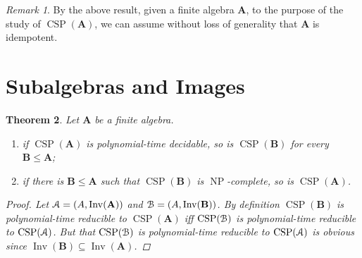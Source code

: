 \documentclass{amsart}
\theoremstyle{plain}
\newtheorem{theorem}{Theorem}[section]
\theoremstyle{definition}
\theoremstyle{remark}
\newtheorem{remark}[theorem]{Remark}
\DeclareMathOperator{\CSP}{CSP}
\DeclareMathOperator{\Inv}{Inv}
\DeclareMathOperator{\NP}{NP}
\begin{document}
\begin{remark}
    By the above result, given a finite algebra $\mathbf{A}$, to the purpose of the study of $\CSP(\mathbf{A})$, we can assume without loss of generality that $\mathbf{A}$ is idempotent. 
\end{remark}

\section{Subalgebras and Images}
\begin{theorem}
    \label{sub}
    Let $\mathbf{A}$ be a finite algebra. 
    \begin{enumerate}
        \item if $\CSP(\mathbf{A})$ is polynomial-time decidable, so is $\CSP(\mathbf{B})$ for every $\mathbf{B} \le \mathbf{A}$; 
        \item if there is $\mathbf{B} \le \mathbf{A}$ such that $\CSP(\mathbf{B})$ is $\NP$-complete, so is $\CSP(\mathbf{A})$. 
    \end{enumerate}
    \begin{proof}
    Let $\EuScript{A}=(A, \Inv(\mathbf{A}))$ and $\EuScript{B}=(A, \Inv(\mathbf{B}))$. 
    By definition $\CSP(\mathbf{B})$ is polynomial-time reducible to $\CSP(\mathbf{A})$ iff 
    $\CSP(\EuScript{B})$ is polynomial-time reducible to $\CSP(\EuScript{A})$.
    But that $\CSP(\EuScript{B})$ is polynomial-time reducible to $\CSP(\EuScript{A})$ is obvious since $\Inv(\mathbf{B}) \subseteq \Inv(\mathbf{A})$.
    \end{proof}
\end{theorem}
\end{document}
